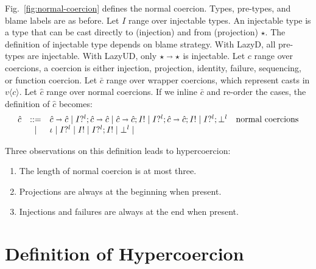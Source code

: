 \documentclass[acmsmall,review,anonymous]{acmart}\settopmatter{printfolios=true,printccs=false,printacmref=false}
\newcommand{\figref}[1]{Fig.~\ref{#1}}
\newcommand{\stxrule}[3]{#1 & ::= & #3 & \text{#2}\\}
\newcommand{\stxrulecont}[1]{& | & #1 & \\}
\newcommand{\lazyUD}{Lazy\;UD}
\newcommand{\lazyD}{Lazy\;D}
\newcommand{\TOOdyn}[0]{\star}
\newcommand{\POOfun}[2]{#1 \shortrightarrow #2}
\newcommand{\vOOcast}[2]{#1\langle#2\rangle}
\newcommand{\ncProj}[2]{#1?^{#2}}
\newcommand{\ncInj}[1]{#1!}
\newcommand{\ncId}[0]{\iota}
\newcommand{\ncSeq}[2]{#1;#2}
\newcommand{\ncFail}[1]{\bot^{#1}}
\newcommand{\ncFun}[2]{\POOfun{#1}{#2}}
\begin{document}
\figref{fig:normal-coercion} defines the normal coercion.
Types, pre-types, and blame labels are as before.
Let $ I $ range over injectable types. An injectable type is a type that can 
be cast directly to (injection) and from (projection) $ \TOOdyn $. The 
definition of injectable type depends on blame strategy. With \lazyD, all 
pre-types are injectable. With \lazyUD, only $ \POOfun{\TOOdyn}{\TOOdyn} $ 
is injectable. 
Let $ c $ range over coercions, a coercion is either injection, projection, 
identity, failure, sequencing, or function coercion.
Let $ \bar{c} $ range over wrapper coercions, which represent casts in $ 
\vOOcast{v}{c} $.
Let $ \hat{c} $ range over normal coercions. If we inline $ \bar{c} $ and 
re-order the cases, the definition of $ \hat{c} $ becomes:
\[
\begin{array}{rclr}
\stxrule{\hat{c}}{normal coercions}{
	\ncFun{\hat{c}}{\hat{c}} \mid
	\ncSeq{\ncProj{I}{l}}{\ncFun{\hat{c}}{\hat{c}}} \mid
	\ncSeq{\ncFun{\hat{c}}{\hat{c}}}{\ncInj{I}} \mid
	\ncSeq{\ncProj{I}{l}}{\ncSeq{\ncFun{\hat{c}}{\hat{c}}}{\ncInj{I}}} \mid
	\ncSeq{\ncProj{I}{l}}{\ncFail{l}}
}
\stxrulecont{
	\ncId \mid
	\ncProj{I}{l} \mid
	\ncInj{I} \mid
	\ncSeq{\ncProj{I}{l}}{\ncInj{I}} \mid
	\ncFail{l} \mid
}
\end{array}
\]

Three observations on this definition leads to hypercoercion: 
\begin{enumerate}
	\item The length of normal coercion is at most three.
	\item Projections are always at the beginning when present.
	\item Injections and failures are always at the end when present.
\end{enumerate}


\section{Definition of Hypercoercion} \label{sec:hypercoercion-definition}
\end{document}
